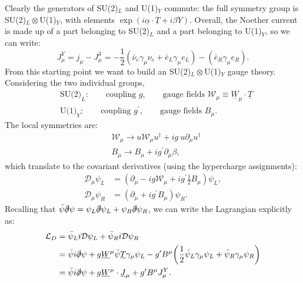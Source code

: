 Clearly the generators of SU(2)$_L$ and U(1)$_Y$ commute: the full symmetry group is SU(2)$_L \otimes$U(1)$_Y$, with elements $\exp{(i \underline{\alpha} \cdot \underline{T} + i \beta Y)}$. Overall, the Noether current is made up of a part belonging to SU(2)$_L$ and a part belonging to U(1)$_Y$, so we can write:
\begin{equation}
J_\mu^Y = j_\mu - J_\mu^3 = - \frac{1}{2}(\bar{\nu}_e \gamma_\mu \nu_e + \bar{e}_L \gamma_\mu e_L) - (\bar{e}_R \gamma_\mu e_R).
\end{equation}
From this starting point we want to build an SU(2)$_L \otimes$U(1)$_Y$ gauge theory. Considering the two individual groups,
\begin{equation}
\begin{split}
&\text{SU(2)}_L: \qquad \text{coupling \ } g, \qquad \text{gauge fields \ } \mathcal{W}_\mu \equiv \underline{W}_\mu \cdot \underline{T} \\
&\text{U(1)}_Y: \qquad \text{coupling \ } g^\prime, \qquad \text{gauge fields \ } B_\mu.
\end{split}
\end{equation}
The local symmetries are:
\begin{equation}
\begin{split}
&\mathcal{W}_\mu \to u \mathcal{W}_\mu u^\dagger + ig\ u \partial_\mu u^\dagger \\
&B_\mu \to B_\mu + i g^\prime \partial_\mu \beta,
\end{split}
\end{equation}
which translate to the covariant derivatives (using the hypercharge assignments):
\begin{equation}
\begin{split}
\mathcal{D}_\mu \psi_L &= (\partial_\mu - ig \mathcal{W}_\mu + i g^\prime \frac{1}{2} B_\mu) \psi_L, \\
\mathcal{D}_\mu \psi_R &= (\partial_\mu + i g^\prime B_\mu) \psi_R.
\end{split}
\end{equation}
Recalling that $\bar{\psi}\slashed{\partial}\psi = \psi_L \slashed{\partial} \psi_L + \psi_R \slashed{\partial} \psi_R$, we can write the Lagrangian explicitly as:
\begin{equation} 
\label{eqn:20a}
\begin{split}
\mathcal{L}_D &= \bar{\psi}_L i \mathcal{D} \psi_L +  \bar{\psi}_R i \mathcal{D} \psi_R \\
&= \bar{\psi} i \slashed{\partial} \psi + g \underline{W}^\mu \bar{\psi} \underline{T} \gamma_\mu \psi_L - g^\prime B^\mu \bigg( \frac{1}{2} \bar{\psi}_L \gamma_\mu \psi_L + \bar{\psi}_R \gamma_\mu \psi_R \bigg) \\
& = \bar{\psi} i \slashed{\partial} \psi + g \underline{W}^\mu \cdot \underline{J}_\mu + g^\prime B^\mu J_\mu^Y.
\end{split}
\end{equation}
